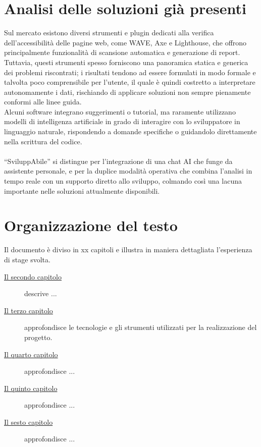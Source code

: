 \section{Analisi delle soluzioni già presenti}
Sul mercato esistono diversi strumenti e plugin dedicati alla verifica dell’accessibilità delle pagine web, come WAVE, Axe e Lighthouse, che offrono principalmente funzionalità di scansione automatica e generazione di report.\\ 
Tuttavia, questi strumenti spesso forniscono una panoramica statica e generica dei problemi riscontrati; i risultati tendono ad essere formulati in modo formale e talvolta poco comprensibile per l’utente, il quale è quindi costretto a interpretare autonomamente i dati, rischiando di applicare soluzioni non sempre pienamente conformi alle linee guida.\\ 
Alcuni software integrano suggerimenti o tutorial, ma raramente utilizzano modelli di intelligenza artificiale in grado di interagire con lo sviluppatore in linguaggio naturale, rispondendo a domande specifiche o guidandolo direttamente nella scrittura del codice. \\
\\
“SviluppAbile” si distingue per l’integrazione di una chat AI che funge da assistente personale, e per la duplice modalità operativa che combina l’analisi in tempo reale con un supporto diretto allo sviluppo, colmando così una lacuna importante nelle soluzioni attualmente disponibili.

\section{Organizzazione del testo}
Il documento è diviso in xx capitoli e illustra in maniera dettagliata l’esperienza di stage svolta.

\begin{description}
    \item[{\hyperref[chap:analisi-requisiti]{Il secondo capitolo}}] descrive ...
    \item[{\hyperref[chap:linguaggi-tecnologie]{Il terzo capitolo}}] approfondisce le tecnologie e gli strumenti utilizzati per la realizzazione del progetto.
    \item[{\hyperref[chap:progettazione]{Il quarto capitolo}}] approfondisce ...
    \item[{\hyperref[chap:test]{Il quinto capitolo}}] approfondisce ...
    \item[{\hyperref[chap:risultato]{Il sesto capitolo}}] approfondisce ...
\end{description}

